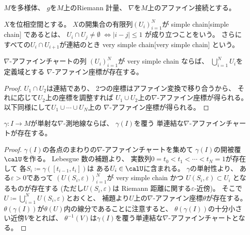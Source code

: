 \documentclass[report]{jlreq}
\begin{document}
$M$を多様体、
$g$を$M$上のRiemann 計量、
$\nabla$を$M$上のアファイン接続とする。

\begin{definition}
    $X$を位相空間とする。
    $X$の開集合の有限列$(U_i)_{i = 1}^N$が
        {simple chain}[simple chain]
    であるとは、
    $U_i \cap U_j \neq \emptyset \;
        \iff |i - j| \le 1$
    が成り立つことをいう。
    さらにすべての$U_i \cap U_{i + 1}$が連結のとき
        {very simple chain}[very simple chain]
    という。
\end{definition}

\begin{lemma}
    $\nabla$-アファインチャートの列
    $(U_i)_{i = 1}^N$が
    very simple chain ならば、
    $\textstyle \bigcup_{i = 1}^N U_i$を定義域とする
    $\nabla$-アファイン座標が存在する。
\end{lemma}

\begin{proof}
    $U_1 \cap U_2$は連結であり、
    2つの座標はアファイン変換で移り合うから、
    それに応じて$U_2$上の座標を調整すれば
    $U_1 \cup U_2$上の$\nabla$-アファイン座標が得られる。
    以下同様にして$U_1 \cup \cdots \cup U_N$上の
    $\nabla$-アファイン座標が得られる。
\end{proof}

\begin{proposition}
    $\gamma \colon I \to M$が単射な$\nabla$-測地線ならば、
    $\gamma(I)$を覆う
    単連結な$\nabla$-アファインチャートが存在する。
\end{proposition}

\begin{proof}
    $\gamma(I)$の各点のまわりの$\nabla$-アファインチャートを集めて
    $\gamma(I)$の開被覆$\calU$を作る。
    Lebesgue 数の補題より、
    実数列$0 = t_0 < t_1 < \cdots < t_N = 1$が存在して
    各$S_i \coloneqq \gamma([t_{i - 1}, t_i])$は
    ある$U_i \in \calU$に含まれる。
    $\gamma$の単射性より、
    ある$\varepsilon > 0$であって
    $(U(S_i, \varepsilon))_{i = 1}^N$が
    very simple chain かつ
    $U(S_i, \varepsilon) \subset U_i$
    となるものが存在する
    (ただし$U(S_i, \varepsilon)$は Riemann 距離に関する$\varepsilon$-近傍)。
    そこで$\textstyle U \coloneqq \bigcup_{i = 1}^N U(S_i, \varepsilon)$とおくと、
    補題より$U$上の$\nabla$-アファイン座標$\theta$が存在する。
    $\theta(\gamma(I))$が$\theta(U)$内の線分であることに注意すると、
    $\theta(\gamma(I))$の十分小さい近傍$V$をとれば、
    $\theta^{-1}(V)$は$\gamma(I)$を覆う単連結な$\nabla$-アファインチャートとなる。
\end{proof}
\end{document}
